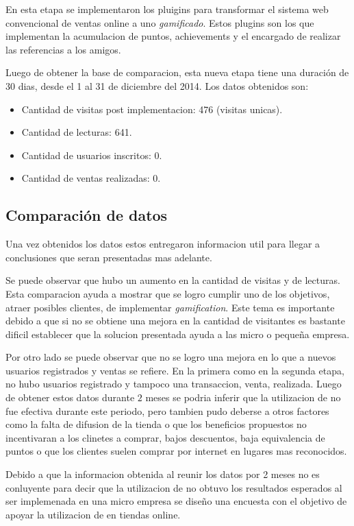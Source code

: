 En esta etapa se implementaron los pluigins para transformar el sistema web convencional de ventas
online a uno \emph{gamificado}. Estos plugins son los que implementan la acumulacion de puntos, 
achievements y el encargado de realizar las referencias a los amigos.

Luego de obtener la base de comparacion, esta nueva etapa tiene una duración de 30 dias, desde 
el 1 al 31 de diciembre del 2014. Los datos obtenidos son:

\begin{itemize}
\item Cantidad de visitas post implementacion: 476 (visitas unicas).
\item Cantidad de lecturas: 641.
\item Cantidad de usuarios inscritos: 0.
\item Cantidad de ventas realizadas: 0.
\end{itemize}

\subsection{Comparación de datos}

Una vez obtenidos los datos estos entregaron informacion util para llegar a conclusiones que seran 
presentadas mas adelante. 

Se puede observar que hubo un aumento en la cantidad de visitas y de lecturas. Esta comparacion 
ayuda a mostrar que se logro cumplir uno de los objetivos, atraer posibles clientes, de implementar
 \emph{gamification}. Este tema es importante debido a que si no se obtiene una mejora en la cantidad
de visitantes es bastante dificil establecer que la solucion presentada ayuda a las micro o pequeña
empresa.

Por otro lado se puede observar que no se logro una mejora en lo que a nuevos usuarios registrados y 
ventas se refiere. En la primera como en la segunda etapa, no hubo usuarios registrado y tampoco
una transaccion, venta, realizada.
Luego de obtener estos datos durante $2$ meses se podria inferir que la utilizacion de {\GAM} no fue 
efectiva durante este periodo, pero tambien pudo deberse a otros factores como la falta de difusion 
de la tienda o que los beneficios propuestos no incentivaran a los clinetes a comprar, bajos descuentos,
baja equivalencia de puntos o que los clientes suelen comprar por internet en lugares mas reconocidos.

Debido a que la informacion obtenida al reunir los datos por 2 meses no es conluyente para decir que
la utilizacion de {\GAM} no obtuvo los resultados esperados al ser implemenada en una micro empresa se
diseño una encuesta con el objetivo de apoyar la utilizacion de {\GAM} en tiendas online.

